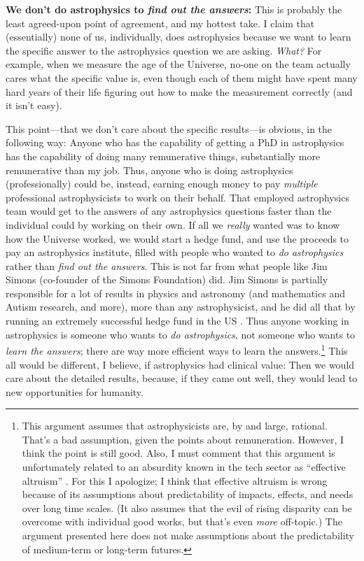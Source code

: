 \documentclass{article}
\newcommand{\paragraphskip}{\medskip}
\renewcommand{\paragraph}[1]{\par\paragraphskip\noindent\textbf{#1}}
\begin{document}
\paragraph{We don't do astrophysics to \emph{find out the answers}:}
This is probably the least agreed-upon point of agreement, and my hottest take.
I claim that (essentially) none of us, individually, does astrophysics because we want to learn the specific answer to the astrophysics question we are asking.
\emph{What?}
For example, when we measure the age of the Universe, no-one on the team actually cares what the specific value is, even though each of them might have spent many hard years of their life figuring out how to make the measurement correctly (and it isn't easy).

This point---that we don't care about the specific results---is obvious, in the following way:
Anyone who has the capability of getting a PhD in astrophysics has the capability of doing many remunerative things, substantially more remunerative than my job.
Thus, anyone who is doing astrophysics (professionally) could be, instead, earning enough money to pay \emph{multiple} professional astrophysicists to work on their behalf.
That employed astrophysics team would get to the answers of any astrophysics questions faster than the individual could by working on their own.
If all we \emph{really} wanted was to know how the Universe worked, we would start a hedge fund, and use the proceeds to pay an astrophysics institute, filled with people who wanted to \emph{do astrophysics} rather than \emph{find out the answers}.
This is not far from what people like Jim Simons (co-founder of the Simons Foundation) did.
Jim Simons is partially responsible for a lot of results in physics and astronomy (and mathematics and Autism research, and more), more than any astrophysicist,
and he did all that by running an extremely successful hedge fund in the US \cite{simons}.
Thus anyone working in astrophysics is someone who wants to \emph{do astrophysics}, not someone who wants to \emph{learn the answers}; there are way more efficient ways to learn the answers.\footnote{%
This argument assumes that astrophysicists are, by and large, rational.
That's a bad assumption, given the points about remuneration.
However, I think the point is still good.
Also, I must comment that this argument is unfortunately related to an absurdity known in the tech sector as ``effective altruism'' \cite{effectivealtruism}.
For this I apologize; I think that effective altruism is wrong because of its assumptions about predictability of impacts, effects, and needs over long time scales.
(It also assumes that the evil of rising disparity can be overcome with individual good works, but that's even \emph{more} off-topic.)
The argument presented here does not make assumptions about the predictability of medium-term or long-term futures.}
This all would be different, I believe, if astrophysics had clinical value:
Then we would care about the detailed results, because, if they came out well, they would lead to new opportunities for humanity.
\end{document}
